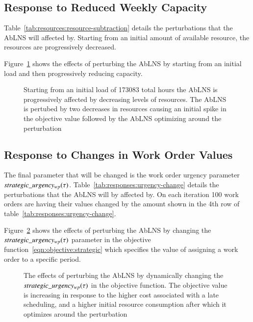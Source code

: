 \subsection{Response to Reduced Weekly Capacity}\label{sec:results:reduced_weekly_capacity}
Table~\ref{tab:resources:resource-subtraction} details the perturbations that the
AbLNS will affected by. Starting from an initial amount of available
resource, the resources are progressively decreased.



Figure~\ref{fig:responses:resource-subtraction} shows the effects of perturbing
the AbLNS by starting from an initial load and then progressively reducing
capacity.

\begin{figure}[H]%
	\centering
	\resizebox{10cm}{!}{
		
	}
	\caption{Starting from an initial load of 173083 total hours the AbLNS is 
		progressively affected by decreasing levels of resources. The AbLNS is pertubed by two decreases
		in resources causing an initial spike in the objective value followed 
		by the AbLNS optimizing around the perturbation
	}\label{fig:responses:resource-subtraction}
\end{figure}

\subsection{Response to Changes in Work Order Values}\label{sec:results:strategic_value_changes}
The final parameter that will be changed is the work order urgency parameter
$strategic\_urgency_{wp}(\tau)$. Table~\ref{tab:responses:urgency-change} details the
perturbations that the AbLNS will by affected by. On each iteration 100 work
orders are having their values changed by the amount  shown in the 4th row of
table~\ref{tab:responses:urgency-change}.



Figure~\ref{fig:responses:value_change} shows the effects of
perturbing the AbLNS by changing the $strategic\_urgency_{wp}(\tau)$ parameter in the objective
function~\ref{eqn:objective:strategic} which specifies the value of assigning a
work order to a specific period.

\begin{figure}[H]%
	\centering
	\resizebox{\linewidth}{!}{
		
	}
	\caption{The effects of perturbing the AbLNS by dynamically changing the
		$strategic\_urgency_{wp}(\tau)$ in the objective function. The objective value
		is increasing in response to the higher cost associated with a late
		scheduling, and a higher initial resource consumption
		after which it optimizes around the perturbation
	}\label{fig:responses:value_change}
\end{figure}
 
